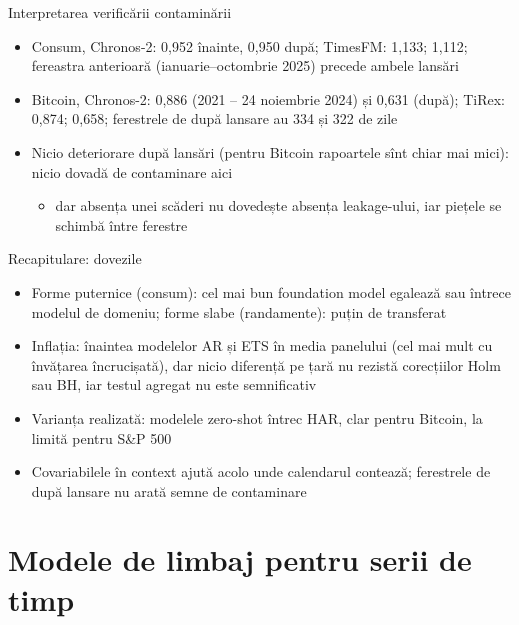 \begin{frame}{Interpretarea verificării contaminării}
\itemsize{\small}
\begin{itemize}
    \item Consum, Chronos-2: 0{,}952 înainte, 0{,}950 după; TimesFM: 1{,}133; 1{,}112; fereastra anterioară (ianuarie--octombrie 2025) precede ambele lansări
    \item Bitcoin, Chronos-2: 0{,}886 (2021 -- 24 noiembrie 2024) și 0{,}631 (după); TiRex: 0{,}874; 0{,}658; ferestrele de după lansare au 334 și 322 de zile
    \item Nicio deteriorare după lansări (pentru Bitcoin rapoartele sînt chiar mai mici): nicio dovadă de contaminare aici
    \begin{itemize}
        \item dar absența unei scăderi nu dovedește absența leakage-ului, iar piețele se schimbă între ferestre
    \end{itemize}
\end{itemize}
\end{frame}

\begin{frame}{Recapitulare: dovezile}
\itemsize{\small}
\begin{itemize}
    \item Forme puternice (consum): cel mai bun foundation model egalează sau întrece modelul de domeniu; forme slabe (randamente): puțin de transferat
    \item Inflația: înaintea modelelor AR și ETS în media panelului (cel mai mult cu învățarea încrucișată), dar nicio diferență pe țară nu rezistă corecțiilor Holm sau BH, iar testul agregat nu este semnificativ
    \item Varianța realizată: modelele zero-shot întrec HAR, clar pentru Bitcoin, la limită pentru S\&P 500
    \item Covariabilele în context ajută acolo unde calendarul contează; ferestrele de după lansare nu arată semne de contaminare
\end{itemize}
\end{frame}


\section{Modele de limbaj pentru serii de timp}

